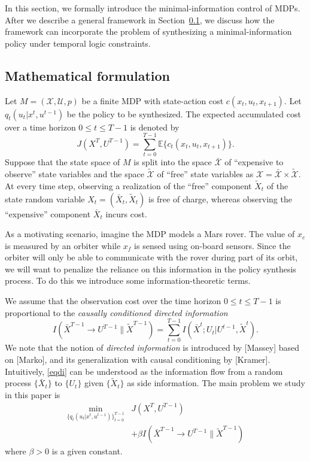 In this section, we formally introduce the minimal-information control of MDPs.
After we describe a general framework in Section~\ref{secformulation}, we discuss how the framework can incorporate the problem of synthesizing a minimal-information policy under temporal logic constraints.

\subsection{Mathematical formulation}
\label{secformulation}

Let $M=(\mathcal{X}, \mathcal{U}, p)$ be a finite MDP with state-action cost $c(x_t, u_t, x_{t+1})$. Let $q_t(u_t|x^t,u^{t-1})$ be the policy to be synthesized. The expected accumulated cost over a time horizon $0\leq t \leq T-1$ is denoted by
\[
J(X^T, U^{T-1})=\sum_{t=0}^{T-1}\mathbb{E}\{c_t(x_t, u_t, x_{t+1})\}.
\]
Suppose that the state space of $M$ is split into the space $\bar{\mathcal{X}}$ of ``expensive to observe'' state variables and the space $\tilde{\mathcal{X}}$ of ``free'' state variables as $\mathcal{X}=\bar{\mathcal{X}}\times \tilde{\mathcal{X}}$.
At every time step, observing a realization of the ``free'' component $\tilde{X}_t$ of the state random variable $X_t=(\bar{X}_t, \tilde{X}_t)$ is free of charge, whereas observing the ``expensive'' component $\bar{X}_t$ incurs cost. 

As a motivating scenario, imagine the MDP models a Mars rover. The value of $x_e$ is measured by an orbiter while $x_f$ is sensed using on-board sensors. Since the orbiter will only be able to communicate with the rover during part of its orbit, we will want to penalize the reliance on this information in the policy synthesis process. To do this we introduce some information-theoretic terms. 

We assume that the observation cost over the time horizon $0\leq t\leq T-1$ is proportional to the \emph{causally conditioned directed information}
\begin{equation}
\label{eqdi}
I(\bar{X}^{T-1}\rightarrow U^{T-1}\| \tilde{X}^{T-1})=\sum_{t=0}^{T-1} I(\bar{X}^t; U_t|U^{t-1},\tilde{X}^t).
\end{equation}
We note that the notion of \emph{directed information} is introduced by [Massey] based on [Marko], and its generalization with causal conditioning by [Kramer]. Intuitively, \eqref{eqdi} can be understood as the information flow from a random process $\{\bar{X}_t\}$ to $\{U_t\}$ given $\{\tilde{X}_t\}$ as side information.
The main problem we study in this paper is
\begin{align}
\min_{\{q_t(u_t|x^t,u^{t-1})\}_{t=0}^{T-1}} & J(X^T, U^{T-1}) \nonumber \\
&+\beta I(\bar{X}^{T-1}\rightarrow U^{T-1}\| \tilde{X}^{T-1}) \label{eqmainproblem}
\end{align}
where $\beta>0$ is a given constant.

